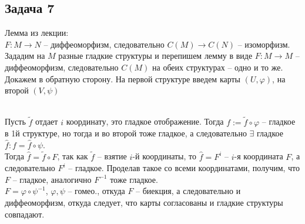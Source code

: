 \subsection*{Задача 7}
	Лемма из лекции:\\
	$F: M \to N$ -- диффеоморфизм, следовательно $C(M) \to C(N)$ -- изоморфизм.\\
	Зададим на $M$ разные гладкие структуры и перепишем лемму в виде $F: M \to M$ -- диффеоморфизм, следовательно $C(M)$ на обеих структурах -- одно и то же.\\
	Докажем в обратную сторону. На первой структуре введем карты $(U,\varphi)$, на второй $(V, \psi)$\\
	\\
	Пусть $\tilde{f}$ отдает $i$ координату, это гладкое отображение. Тогда $f := \tilde{f} \circ \varphi$ -- гладкое в 1й структуре, но тогда и во второй тоже гладкое, а следовательно $\exists$ гладкое $\hat{f}: f = \hat{f} \circ \psi$.\\
	Тогда $\hat{f} = \tilde{f} \circ F$, так как $\tilde{f}$ -- взятие $i$-й координаты, то $\hat{f} = F^i$ -- $i$-я координата $F$, а следовательно $F^i$ -- гладкое. Проделав такое со всеми координатами, получим, что $F$ -- гладкое, аналогично $F^{-1}$ тоже гладкое.\\
	$F = \varphi \circ \psi^{-1}$, $\varphi,\psi$ -- гомео., откуда $F$ -- биекция, а следовательно и диффеоморфизм, откуда следует, что карты согласованы и гладкие структуры совпадают.

